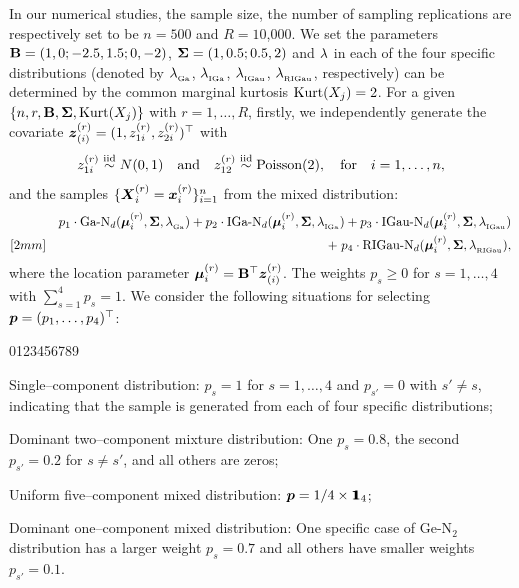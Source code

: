 In our numerical studies, the sample size, the number of sampling replications are respectively set to be $n = 500$ and $R = 10$,000. We set the parameters ${\bf B} = (1, 0; -2.5, 1.5; 0, -2)$, ${\mbox{\boldmath$\Sigma$}} = (1, 0.5; 0.5, 2)$ and $\lambda$ in each of the four specific distributions (denoted by ${\lambda}_{_{\textrm{Ga}}}$, ${\lambda}_{_{\textrm{IGa}}}$, ${\lambda}_{_{\textrm{IGau}}}$, ${\lambda}_{_{\textrm{RIGau}}}$, respectively) can be determined by the common marginal kurtosis $\mbox{Kurt}(X_j) = 2$. For a given $\{n, r, {\bf B}, {\mbox{\boldmath$\Sigma$}}, \mbox{Kurt}(X_j)\}$ with $r = 1, \dots, R$, firstly, we independently generate the covariate ${\boldsymbol{z}}_{(i)}^{(r)} = (1, z_{1i}^{(r)}, z_{2i}^{(r)})^\top$ with
$$
    z_{1i}^{(r)} \stackrel{{\rm iid}}{\sim} N(0, 1) \quad \mbox{and} \quad z_{12}^{(r)} \stackrel{{\rm iid}}{\sim} \mbox{Poisson}(2), \quad \mbox{for} \quad i = 1, \dots, n,
$$
and the samples $\{{\boldsymbol{X}}_i^{(r)} = {\boldsymbol{x}}_i^{(r)}\}_{i=1}^n$ from the mixed distribution:
\begin{eqnarray*}
    && p_1 \cdot \mbox{Ga-N}_d({\boldsymbol{\mu}}_i^{(r)}, {\mbox{\boldmath$\Sigma$}}, {\lambda}_{_{\textrm{Ga}}}) + p_2 \cdot \mbox{IGa-N}_d({\boldsymbol{\mu}}_i^{(r)}, {\mbox{\boldmath$\Sigma$}}, {\lambda}_{_{\textrm{IGa}}}) + p_3 \cdot \mbox{IGau-N}_d({\boldsymbol{\mu}}_i^{(r)}, {\mbox{\boldmath$\Sigma$}}, {\lambda}_{_{\textrm{IGau}}}) \\ [2mm]
    && +\; p_4 \cdot \mbox{RIGau-N}_d({\boldsymbol{\mu}}_i^{(r)}, {\mbox{\boldmath$\Sigma$}}, {\lambda}_{_{\textrm{RIGau}}}),
\end{eqnarray*}
where the location parameter ${\boldsymbol{\mu}}_i^{(r)} = {\bf B}^\top {\boldsymbol{z}}_{(i)}^{(r)}$. The weights $p_s \ge 0$ for $s = 1, \dots, 4$ with $\sum_{s=1}^4 p_s = 1$. We consider the following situations for selecting ${\boldsymbol{p}} = (p_1, \dots, p_4)^\top$:
\begin{namelist}{0123456789}
\item[\hspace*{-0.05cm} Case (C$_1$):] Single--component distribution: $p_s = 1$ for $s = 1, \dots, 4$ and $p_{s'} = 0$ with $s'\ne s$, indicating that the sample is generated from each of four specific distributions;

\item[\hspace*{-0.05cm} Case (C$_2$):] Dominant two--component mixture distribution: One $p_s = 0.8$, the second $p_{s'} = 0.2$ for $s \ne s'$, and all others are zeros;

\item[\hspace*{-0.05cm} Case (C$_3$):] Uniform five--component mixed distribution: ${\boldsymbol{p}}=1/4\times{\bf 1}\!\!\!{\bf 1}_4$;

\item[\hspace*{-0.05cm} Case (C$_4$):] Dominant one--component mixed distribution: One specific case of Ge-N$_2$ distribution has a larger weight $p_s = 0.7$ and all others have smaller weights $p_{s'} = 0.1$.
\end{namelist}

